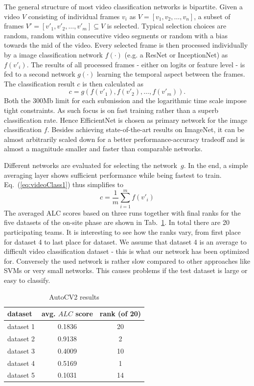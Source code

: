 \documentclass{article}
\begin{document}
The general structure of most video classification networks is bipartite. Given a video $V$ consisting of individual frames $v_i$ as $V = [v_1, v_2, \ldots, v_n]$, a subset of frames $V' = [v'_1, v'_2, \ldots, v'_m] \subseteq V$ is selected. Typical selection choices are random, random within consecutive video segments or random with a bias towards the mid of the video. Every selected frame is then processed individually by a image classification network $f(\cdot)$ (e.g. a ResNet or InceptionNet) as $f(v'_i)$. The results of all processed frames - either on logits or feature level - is fed to a second network $g(\cdot)$ learning the temporal aspect between the frames. The classification result $c$ is then calculated as 
%
\begin{equation}
c = g\left(f(v'_1), f(v'_2), \ldots, f(v'_m) \right).
\label{eq:videoClass1}
\end{equation}
%
Both the 300Mb limit for each submission and the logarithmic time scale impose tight constraints. As such focus is on fast training rather than a superb classification rate. Hence EfficientNet is chosen as primary network for the image classification $f$. Besides achieving state-of-the-art results on ImageNet, it can be almost arbitrarily scaled down for a better performance-accuracy tradeoff and is almost a magnitude smaller and faster than comparable networks. 

Different networks are evaluated for selecting the network~$g$. In the end, a simple averaging layer shows sufficient performance while being fastest to train. Eq.~(\ref{eq:videoClass1}) thus simplifies to 
%
\begin{equation}
c = \frac{1}{m}\sum\limits_{i=1}^m f(v'_i)
\label{eq:videoClass2}
\end{equation}
%
The averaged ALC scores based on three runs together with final ranks for the five datasets of the on-site phase are shown in Tab.~\ref{table:autocv2}. In total there are 20 participating teams. It is interesting to see how the ranks vary, from first place for dataset 4 to last place for dataset. We assume that dataset 4 is an average to difficult video classification dataset - this is what our network has been optimized for. Conversely the used network is rather slow compared to other approaches like SVMs or very small networks. This causes problems if the test dataset is large or easy to classify. 
%
\begin{table}
\center
\begin{tabular}{|l|c|c|}
\hline
dataset & avg. $ALC$ score & rank (of 20) \\
\hline
dataset 1 & 0.1836 & 20 \\
dataset 2 & 0.9138 & 2  \\
dataset 3 & 0.4009 & 10 \\
dataset 4 & 0.5169 & 1  \\
dataset 5 & 0.1031 & 14 \\
\hline
\end{tabular}
\normalsize
\caption{AutoCV2 results}
\label{table:autocv2}
\end{table}
\end{document}
